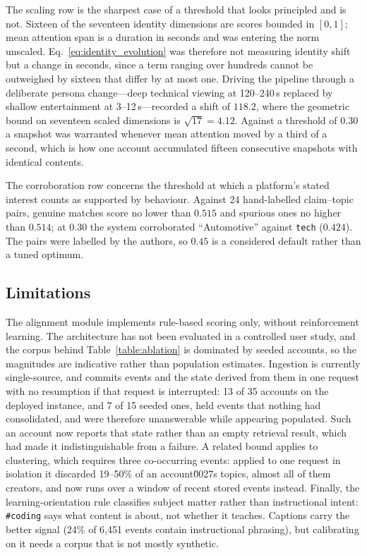 \documentclass[conference]{IEEEtran}
\begin{document}
The scaling row is the sharpest case of a threshold that looks principled and is not. Sixteen of the seventeen identity dimensions are scores bounded in $[0,1]$; mean attention span is a duration in seconds and was entering the norm unscaled. Eq.~\eqref{eq:identity_evolution} was therefore not measuring identity shift but a change in seconds, since a term ranging over hundreds cannot be outweighed by sixteen that differ by at most one. Driving the pipeline through a deliberate persona change---deep technical viewing at 120--240\,s replaced by shallow entertainment at 3--12\,s---recorded a shift of $118.2$, where the geometric bound on seventeen scaled dimensions is $\sqrt{17} = 4.12$. Against a threshold of $0.30$ a snapshot was warranted whenever mean attention moved by a third of a second, which is how one account accumulated fifteen consecutive snapshots with identical contents.

The corroboration row concerns the threshold at which a platform's stated interest counts as supported by behaviour. Against 24 hand-labelled claim--topic pairs, genuine matches score no lower than $0.515$ and spurious ones no higher than $0.514$; at $0.30$ the system corroborated ``Automotive'' against \texttt{tech} ($0.424$). The pairs were labelled by the authors, so $0.45$ is a considered default rather than a tuned optimum.

\subsection{Limitations}
The alignment module implements rule-based scoring only, without reinforcement learning. The architecture has not been evaluated in a controlled user study, and the corpus behind Table~\ref{table:ablation} is dominated by seeded accounts, so the magnitudes are indicative rather than population estimates. Ingestion is currently single-source, and commits events and the state derived from them in one request with no resumption if that request is interrupted: 13 of 35 accounts on the deployed instance, and 7 of 15 seeded ones, held events that nothing had consolidated, and were therefore unanswerable while appearing populated. Such an account now reports that state rather than an empty retrieval result, which had made it indistinguishable from a failure. A related bound applies to clustering, which requires three co-occurring events: applied to one request in isolation it discarded 19--50\% of an account\u0027s topics, almost all of them creators, and now runs over a window of recent stored events instead. Finally, the learning-orientation rule classifies subject matter rather than instructional intent: \texttt{\#coding} says what content is about, not whether it teaches. Captions carry the better signal (24\% of 6{,}451 events contain instructional phrasing), but calibrating on it needs a corpus that is not mostly synthetic.
\end{document}
